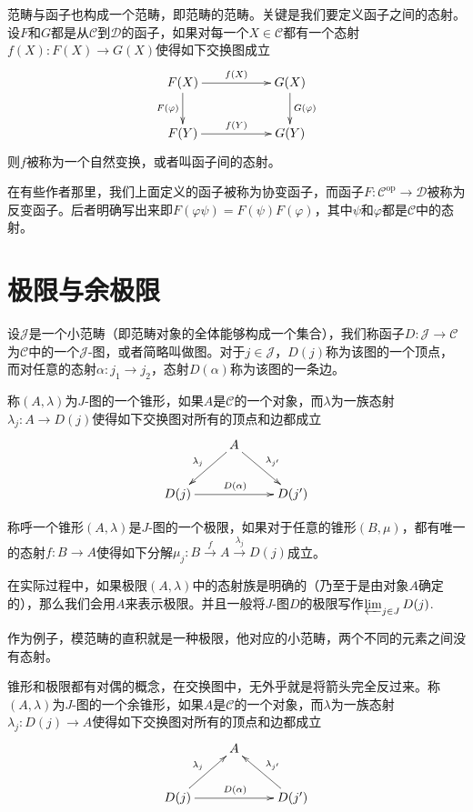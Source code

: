 \para 范畴与函子也构成一个范畴，即范畴的范畴。关键是我们要定义函子之间的态射。设$F$和$G$都是从$\mathcal{C}$到$\mathcal{D}$的函子，如果对每一个$X\in \mathcal{C}$都有一个态射$f(X):F(X)\to G(X)$使得如下交换图成立
\[
\begin{xy}
	\xymatrix
	{
		F(X)\ar[rr]^{f(X)} \ar[d]_{F(\varphi)}&&G(X) \ar[d]^{G(\varphi)}\\
		F(Y)\ar[rr]^{f(Y)}&&G(Y)
	}
\end{xy}
\]
则$f$被称为一个自然变换，或者叫函子间的态射。

\para 在有些作者那里，我们上面定义的函子被称为协变函子，而函子$F:\mathcal{C}^{\mathrm{op}} \to \mathcal{D}$被称为反变函子。后者明确写出来即$F(\varphi\psi)=F(\psi)F(\varphi)$，其中$\psi$和$\varphi$都是$\mathcal{C}$中的态射。

\section{极限与余极限}

\para 设$\mathcal{J}$是一个小范畴（即范畴对象的全体能够构成一个集合），我们称函子$D:\mathcal{J}\to \mathcal{C}$为$\mathcal{C}$中的一个$\mathcal{J}$-图，或者简略叫做图。对于$j\in \mathcal{J}$，$D(j)$称为该图的一个顶点，而对任意的态射$\alpha:j_1\to j_2$，态射$D(\alpha)$称为该图的一条边。

\para 称$(A,\lambda)$为$J$-图的一个{锥形}，如果$A$是$\mathcal{C}$的一个对象，而$\lambda$为一族态射$\lambda_{j}:A\to D(j)$使得如下交换图对所有的顶点和边都成立
\[
	\xymatrix{
		&A \ar[dl]_{\lambda_{j}}\ar[dr]^{\lambda_{j'}}&\\
		D(j)\ar[rr]^{D(\alpha)}&&D(j')
	}
\]

称呼一个锥形$(A,\lambda)$是$J$-图的一个{极限}，如果对于任意的锥形$(B,\mu)$，都有唯一的态射$f:B\to A$使得如下分解$\mu_j:B\xrightarrow{f}A\xrightarrow{\lambda_j}D(j)$成立。

在实际过程中，如果极限$(A,\lambda)$中的态射族是明确的（乃至于是由对象$A$确定的），那么我们会用$A$来表示极限。并且一般将$J$-图$D$的极限写作$\varprojlim_{j\in J} D(j)$.

作为例子，模范畴的直积就是一种极限，他对应的小范畴，两个不同的元素之间没有态射。

\para 锥形和极限都有对偶的概念，在交换图中，无外乎就是将箭头完全反过来。称$(A,\lambda)$为$J$-图的一个{余锥形}，如果$A$是$\mathcal{C}$的一个对象，而$\lambda$为一族态射$\lambda_{j}:D(j)\to A$使得如下交换图对所有的顶点和边都成立
\[
	\xymatrix{
		&A&\\
		D(j)\ar[rr]^{D(\alpha)} \ar[ur]^{\lambda_{j }}&&D(j')\ar[ul]_{\lambda_{j'}}
	}
\]

